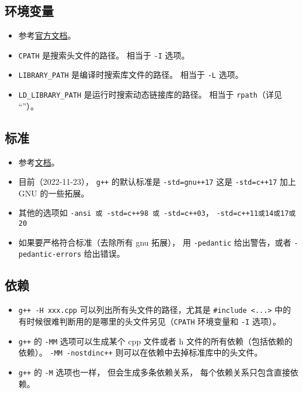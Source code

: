 \subsection{环境变量}
\begin{itemize}
\item 参考\href{https://gcc.gnu.org/onlinedocs/gcc/Environment-Variables.html}{官方文档}。
\item \verb`CPATH` 是搜索头文件的路径。 相当于 \verb`-I` 选项。
\item \verb`LIBRARY_PATH` 是编译时搜索库文件的路径。 相当于 \verb`-L` 选项。
\item \verb`LD_LIBRARY_PATH` 是运行时搜索动态链接库的路径。 相当于 \verb`rpath`（详见 “”）。
\end{itemize}

\subsection{标准}
\begin{itemize}
\item 参考\href{https://gcc.gnu.org/onlinedocs/gcc/Standards.html}{文档}。
\item 目前（2022-11-23）， \verb`g++` 的默认标准是 \verb`-std=gnu++17` 这是 \verb`-std=c++17` 加上 GNU 的一些拓展。
\item 其他的选项如 \verb`-ansi 或 -std=c++98 或 -std=c++03`， \verb`-std=c++11或14或17或20`
\item 如果要严格符合标准（去除所有 gnu 拓展）， 用 \verb`-pedantic` 给出警告，或者 \verb`-pedantic-errors` 给出错误。
\end{itemize}

\subsection{依赖}
\begin{itemize}
\item \verb`g++ -H xxx.cpp` 可以列出所有头文件的路径，尤其是 \verb`#include <...>` 中的有时候很难判断用的是哪里的头文件另见（\verb`CPATH` 环境变量和 \verb`-I` 选项）。
\item \verb`g++` 的 \verb`-MM` 选项可以生成某个 cpp 文件或者 h 文件的所有依赖（包括依赖的依赖）。 \verb`-MM -nostdinc++` 则可以在依赖中去掉标准库中的头文件。
\item \verb`g++` 的 \verb`-M` 选项也一样， 但会生成多条依赖关系， 每个依赖关系只包含直接依赖。
\end{itemize}

